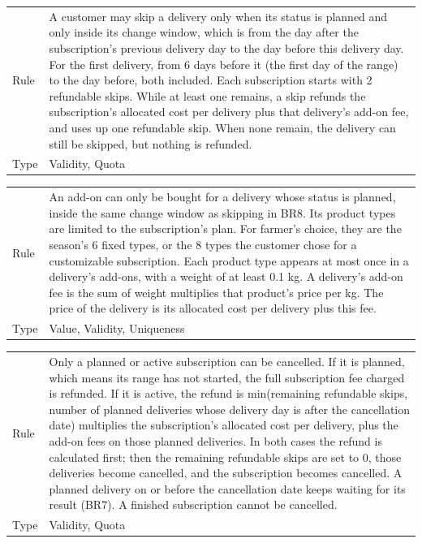 \begin{xltabular}{\linewidth}{@{}KY@{}}
Rule        & A customer may skip a delivery only when its status is planned and only inside its change window, which is from the day after the subscription's previous delivery day to the day before this delivery day. For the first delivery, from 6 days before it (the first day of the range) to the day before, both included. Each subscription starts with 2 refundable skips. While at least one remains, a skip refunds the subscription's allocated cost per delivery plus that delivery's add-on fee, and uses up one refundable skip. When none remain, the delivery can still be skipped, but nothing is refunded. \\
Type        & Validity, Quota\\
\bottomrule
\end{xltabular}

\begin{xltabular}{\linewidth}{@{}KY@{}}
Rule        & An add-on can only be bought for a delivery whose status is planned, inside the same change window as skipping in BR8. Its product types are limited to the subscription's plan. For farmer's choice, they are the season's 6 fixed types, or the 8 types the customer chose for a customizable subscription. Each product type appears at most once in a delivery's add-ons, with a weight of at least 0.1 kg. A delivery's add-on fee is the sum of weight multiplies that product's price per kg. The price of the delivery is its allocated cost per delivery plus this fee. \\
Type        & Value, Validity, Uniqueness\\
\bottomrule
\end{xltabular}

\begin{xltabular}{\linewidth}{@{}KY@{}}
Rule        & Only a planned or active subscription can be cancelled. If it is planned, which means its range has not started, the full subscription fee charged is refunded. If it is active, the refund is min(remaining refundable skips, number of planned deliveries whose delivery day is after the cancellation date) multiplies the subscription's allocated cost per delivery, plus the add-on fees on those planned deliveries. In both cases the refund is calculated first; then the remaining refundable skips are set to 0, those deliveries become cancelled, and the subscription becomes cancelled. A planned delivery on or before the cancellation date keeps waiting for its result (BR7). A finished subscription cannot be cancelled. \\
Type        & Validity, Quota\\
\bottomrule
\end{xltabular}

